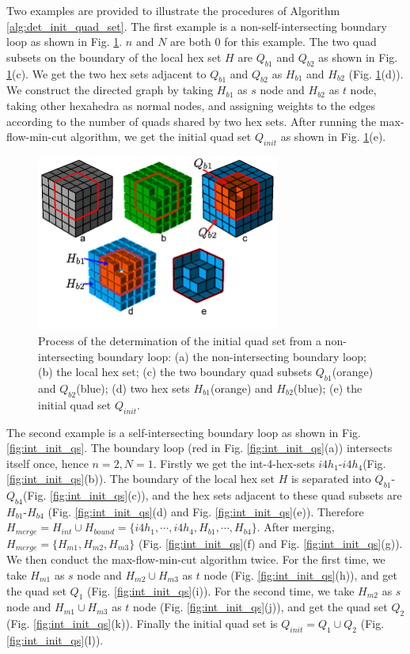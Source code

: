 \documentclass[final,5p,times,twocolumn]{elsarticle}
\begin{document}
Two examples are provided to illustrate the procedures of Algorithm \ref{alg:det_init_quad_set}. The first example is a non-self-intersecting boundary loop as shown in Fig. \ref{fig:non_int_init_qs}. $n$ and $N$ are both 0 for this example. The two quad subsets on the boundary of the local hex set $H$ are $Q_{b1}$ and $Q_{b2}$ as shown in Fig. \ref{fig:non_int_init_qs}(c). We get the two hex sets adjacent to $Q_{b1}$ and $Q_{b2}$ as $H_{b1}$ and $H_{b2}$ (Fig. \ref{fig:non_int_init_qs}(d)). We construct the directed graph by taking $H_{b1}$ as $s$ node and $H_{b2}$ as $t$ node, taking other hexahedra as normal nodes, and assigning weights to the edges according to the number of quads shared by two hex sets. After running the max-flow-min-cut algorithm, we get the initial quad set $Q_{init}$ as shown in Fig. \ref{fig:non_int_init_qs}(e).

\begin{figure}[htbp]
\begin{center}
\includegraphics[width=8cm]{non_int_init_qs.png}
\caption{Process of the determination of the initial quad set from a non-intersecting boundary loop: (a) the non-intersecting boundary loop; (b) the local hex set; (c) the two boundary quad subsets $Q_{b1}$(orange) and $Q_{b2}$(blue); (d) two hex sets $H_{b1}$(orange) and $H_{b2}$(blue); (e) the initial quad set $Q_{init}$.}
\label{fig:non_int_init_qs}
\end{center}
\end{figure}

The second example is a self-intersecting boundary loop as shown in Fig. \ref{fig:int_init_qs}. The boundary loop (red in Fig. \ref{fig:int_init_qs}(a)) intersects itself once, hence $n=2,N=1$. Firstly we get the int-4-hex-sets $i4h_1$-$i4h_4$(Fig. \ref{fig:int_init_qs}(b)). The boundary of the local hex set $H$ is separated into $Q_{b1}$-$Q_{b4}$(Fig. \ref{fig:int_init_qs}(c)), and the hex sets adjacent to these quad subsets are $H_{b1}$-$H_{b4}$ (Fig. \ref{fig:int_init_qs}(d) and Fig. \ref{fig:int_init_qs}(e)). Therefore $H_{merge}=H_{int} \cup H_{bound}=\{i4h_1,\cdots,i4h_4,H_{b1},\cdots,H_{b4}\}$. After merging, $H_{merge}=\{H_{m1},H_{m2},H_{m3}\}$ (Fig. \ref{fig:int_init_qs}(f) and Fig. \ref{fig:int_init_qs}(g)). We then conduct the max-flow-min-cut algorithm twice. For the first time, we take $H_{m1}$ as $s$ node and $H_{m2} \cup H_{m3}$ as $t$ node (Fig. \ref{fig:int_init_qs}(h)), and get the quad set $Q_1$ (Fig. \ref{fig:int_init_qs}(i)). For the second time, we take $H_{m2}$ as $s$ node and $H_{m1} \cup H_{m3}$ as $t$ node (Fig. \ref{fig:int_init_qs}(j)), and get the quad set $Q_2$ (Fig. \ref{fig:int_init_qs}(k)). Finally the initial quad set is $Q_{init}=Q_1 \cup Q_2$ (Fig. \ref{fig:int_init_qs}(l)).
\end{document}
